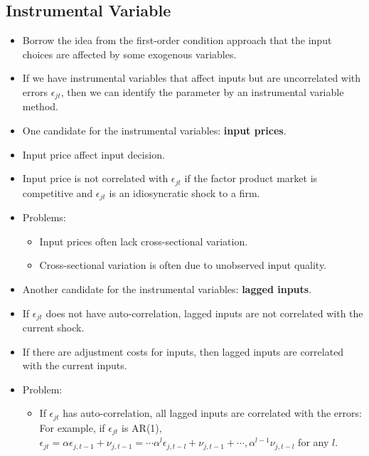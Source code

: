 \documentclass[]{book}
\providecommand{\tightlist}{%
  \setlength{\itemsep}{0pt}\setlength{\parskip}{0pt}}
\theoremstyle{definition}
\theoremstyle{definition}
\theoremstyle{definition}
\theoremstyle{remark}
\begin{document}
\subsection{Instrumental Variable}\label{productioniv}

\begin{itemize}
\item
  Borrow the idea from the first-order condition approach that the input
  choices are affected by some exogenous variables.
\item
  If we have instrumental variables that affect inputs but are
  uncorrelated with errors \(\epsilon_{jt}\), then we can identify the
  parameter by an instrumental variable method.
\item
  One candidate for the instrumental variables: \textbf{input prices}.
\item
  Input price affect input decision.
\item
  Input price is not correlated with \(\epsilon_{jt}\) if the factor
  product market is competitive and \(\epsilon_{jt}\) is an
  idiosyncratic shock to a firm.
\item
  Problems:

  \begin{itemize}
  \tightlist
  \item
    Input prices often lack cross-sectional variation.
  \item
    Cross-sectional variation is often due to unobserved input quality.
  \end{itemize}
\item
  Another candidate for the instrumental variables: \textbf{lagged
  inputs}.
\item
  If \(\epsilon_{jt}\) does not have auto-correlation, lagged inputs are
  not correlated with the current shock.
\item
  If there are adjustment costs for inputs, then lagged inputs are
  correlated with the current inputs.
\item
  Problem:

  \begin{itemize}
  \tightlist
  \item
    If \(\epsilon_{jt}\) has auto-correlation, all lagged inputs are
    correlated with the errors: For example, if \(\epsilon_{jt}\) is
    AR(1),
    \(\epsilon_{jt} = \alpha \epsilon_{j, t - 1} + \nu_{j, t - 1} = \cdots \alpha^l \epsilon_{j, t - l} + \nu_{j, t - 1} + \cdots, \alpha^{l - 1} \nu_{j, t - l}\)
    for any \(l\).
  \end{itemize}
\end{itemize}
\end{document}
